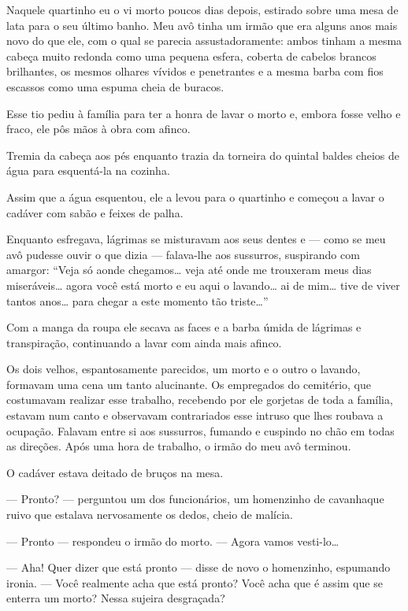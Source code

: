 Naquele quartinho eu o vi morto poucos dias depois, estirado sobre uma mesa de lata para o seu último banho. Meu avô tinha um irmão que era alguns anos mais novo do que ele, com o qual se parecia assustadoramente: ambos tinham a mesma cabeça muito redonda como uma pequena esfera, coberta de cabelos brancos brilhantes, os mesmos olhares vívidos e penetrantes e a mesma barba com fios escassos como uma espuma cheia de buracos.

Esse tio pediu à família para ter a honra de lavar o morto e, embora fosse velho e fraco, ele pôs mãos à obra com afinco.

Tremia da cabeça aos pés enquanto trazia da torneira do quintal baldes cheios de água para esquentá-la na cozinha.

Assim que a água esquentou, ele a levou para o quartinho e começou a lavar o cadáver com sabão e feixes de palha.

Enquanto esfregava, lágrimas se misturavam aos seus dentes e --- como se meu avô pudesse ouvir o que dizia --- falava-lhe aos sussurros, suspirando com amargor: ``Veja só aonde chegamos\ldots{} veja até onde me trouxeram meus dias miseráveis\ldots{} agora você está morto e eu aqui o lavando\ldots{} ai de mim\ldots{} tive de viver tantos anos\ldots{} para chegar a este momento tão triste\ldots{}''

Com a manga da roupa ele secava as faces e a barba úmida de lágrimas e transpiração, continuando a lavar com ainda mais afinco.

Os dois velhos, espantosamente parecidos, um morto e o outro o lavando, formavam uma cena um tanto alucinante. Os empregados do cemitério, que costumavam realizar esse trabalho, recebendo por ele gorjetas de toda a família, estavam num canto e observavam contrariados esse intruso que lhes roubava a ocupação. Falavam entre si aos sussurros, fumando e cuspindo no chão em todas as direções. Após uma hora de trabalho, o irmão do meu avô terminou.

O cadáver estava deitado de bruços na mesa.

--- Pronto? --- perguntou um dos funcionários, um homenzinho de cavanhaque ruivo que estalava nervosamente os dedos, cheio de malícia.

--- Pronto --- respondeu o irmão do morto. --- Agora vamos vesti-lo\ldots{}

--- Aha! Quer dizer que está pronto --- disse de novo o homenzinho, espumando ironia. --- Você realmente acha que está pronto? Você acha que é assim que se enterra um morto? Nessa 
sujeira desgraçada?

